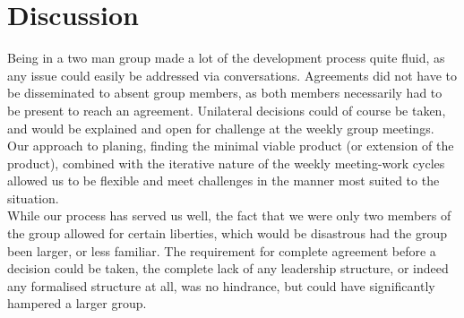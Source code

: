 \section{Discussion}
Being in a two man group made a lot of the development process quite fluid, as any issue could easily be addressed via conversations. Agreements did not have to be disseminated to absent group members, as both members necessarily had to be present to reach an agreement. Unilateral decisions could of course be taken, and would be explained and open for challenge at the weekly group meetings. Our approach to planing, finding the minimal viable product (or extension of the product), combined with the iterative nature of the weekly meeting-work cycles allowed us to be flexible and meet challenges in the manner most suited to the situation.\\ 
While our process has served us well, the fact that we were only two members of the group allowed for certain liberties, which would be disastrous had the group been larger, or less familiar. The requirement for complete agreement before a decision could be taken, the complete lack of any leadership structure, or indeed any formalised structure at all, was no hindrance, but could have significantly hampered a larger group. 